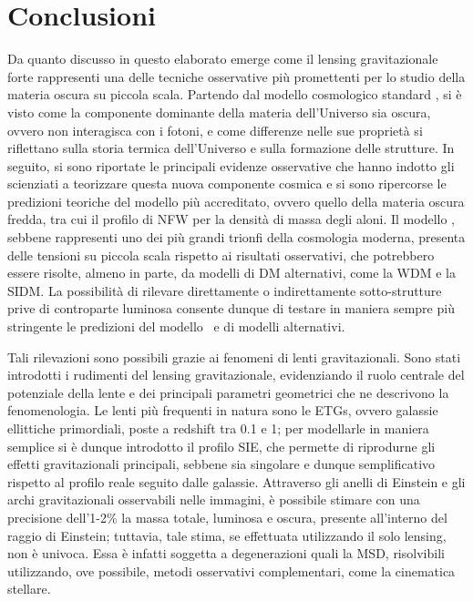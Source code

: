 \chapter{Conclusioni}
\label{cap:conclusioni}
Da quanto discusso in questo elaborato emerge come il lensing gravitazionale forte rappresenti una delle tecniche osservative più promettenti per lo studio della materia oscura su piccola scala. 
Partendo dal modello cosmologico standard \LCDM, si è visto come la componente dominante della materia dell'Universo sia oscura, ovvero non interagisca con i fotoni, e come differenze nelle sue proprietà si riflettano sulla storia termica dell'Universo e sulla formazione delle strutture. In seguito, si sono riportate le principali evidenze osservative che hanno indotto gli scienziati a teorizzare questa nuova componente cosmica e si sono ripercorse le predizioni teoriche del modello più accreditato, ovvero quello della materia oscura fredda, tra cui il profilo di NFW per la densità di massa degli aloni.
Il modello \LCDM, sebbene rappresenti uno dei più grandi trionfi della cosmologia moderna, presenta delle tensioni su piccola scala rispetto ai risultati osservativi, che potrebbero essere risolte, almeno in parte, da modelli di DM alternativi, come la WDM e la SIDM.
La possibilità di rilevare direttamente o indirettamente sotto-strutture prive di controparte luminosa consente dunque di testare in maniera sempre più stringente le predizioni del modello \LCDM\ e di modelli alternativi.

Tali rilevazioni sono possibili grazie ai fenomeni di lenti gravitazionali.
Sono stati introdotti i rudimenti del lensing gravitazionale, evidenziando il ruolo centrale del potenziale della lente e dei principali parametri geometrici che ne descrivono la fenomenologia.
Le lenti più frequenti in natura sono le ETGs, ovvero galassie ellittiche primordiali, poste a redshift tra 0.1 e 1; per modellarle in maniera semplice si è dunque introdotto il profilo SIE, che permette di riprodurne gli effetti gravitazionali principali, sebbene sia singolare e dunque semplificativo rispetto al profilo reale seguito dalle galassie. 
Attraverso gli anelli di Einstein e gli archi gravitazionali osservabili nelle immagini, è possibile stimare con una precisione dell'1-2\% la massa totale, luminosa e oscura, presente all'interno del raggio di Einstein; tuttavia, tale stima, se effettuata utilizzando il solo lensing, non è univoca. Essa è infatti soggetta a degenerazioni quali la MSD, risolvibili utilizzando, ove possibile, metodi osservativi complementari, come la cinematica stellare.


